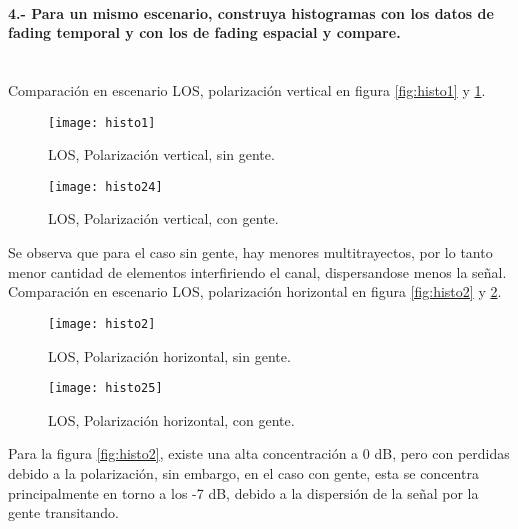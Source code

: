 \documentclass[12pt]{article}
\begin{document}
\paragraph{4.- Para un mismo escenario, construya histogramas con los datos de fading temporal y 
con los de fading espacial y compare.\\ \ \\}

Comparación en escenario LOS, polarización vertical en figura \ref{fig:histo1} y \ref{fig:histo24}.

\begin{figure}[H]
\hfill
\begin{minipage}[t]{.45\textwidth}
  \centering
        \texttt{[image: histo1]}
		\caption{\footnotesize LOS, Polarización vertical, sin gente.}
\label{fig:histo1}
\end{minipage}
\hfill
\begin{minipage}[t]{.45\textwidth}
  \centering
        \texttt{[image: histo24]}
		\caption{\footnotesize LOS, Polarización vertical, con gente.}
\label{fig:histo24}
\end{minipage}
\end{figure}
\footnotesize
Se observa que para el caso sin gente, hay menores multitrayectos, por lo tanto menor cantidad 
de elementos interfiriendo el canal, dispersandose menos la señal.\\
\newpage
\normalsize
Comparación en escenario LOS, polarización horizontal en figura \ref{fig:histo2} y \ref{fig:histo25}.
\begin{figure}[H]
\hfill
\begin{minipage}[t]{.45\textwidth}
  \centering
        \texttt{[image: histo2]}
		\caption{\footnotesize LOS, Polarización horizontal, sin gente.}
\label{fig:histo2}
\end{minipage}
\hfill
\begin{minipage}[t]{.45\textwidth}
  \centering
        \texttt{[image: histo25]}
		\caption{\footnotesize LOS, Polarización horizontal, con gente.}
\label{fig:histo25}
\end{minipage}
\end{figure}
\footnotesize
Para la figura \ref{fig:histo2}, existe una alta concentración a 0 dB, pero con perdidas debido a la 
polarización, sin embargo, en el caso con gente, esta se concentra principalmente en torno
a los -7 dB, debido a la dispersión de la señal por la gente transitando.\\
\end{document}
